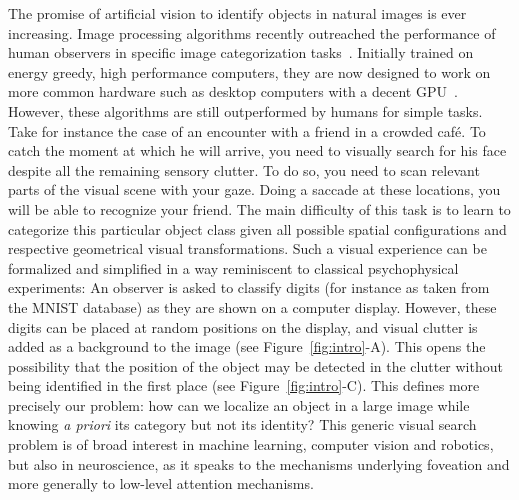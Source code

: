 The promise of artificial vision to identify objects in natural images is ever increasing. Image processing algorithms recently outreached the performance of human observers in specific image categorization tasks~\citep{He15}. Initially trained on energy greedy, high performance computers, they are now designed to work on more common hardware such as desktop computers with a decent GPU~\citep{Sandler18}. However, these algorithms are still outperformed by humans for simple tasks. Take for instance the case of an encounter with a friend in a crowded café. To catch the moment at which he will arrive, you need to visually search for his face despite all the remaining sensory clutter. To do so, you need to scan relevant parts of the visual scene with your gaze. Doing a saccade at these locations, you will be able to recognize your friend. The main difficulty of this task is to learn to categorize this particular object class given all possible spatial configurations and respective geometrical visual transformations. Such a visual experience can be formalized and simplified in a way reminiscent to classical psychophysical experiments: An observer is asked to classify digits (for instance as taken from the MNIST database) as they are shown on a computer display. However, these digits can be placed at random positions on the display, and visual clutter is added as a background to the image (see Figure~\ref{fig:intro}-A). This opens the possibility that the position of the object may be detected in the clutter without being identified in the first place  (see Figure~\ref{fig:intro}-C). This defines more precisely our problem: how can we localize an object in a large image while knowing \emph{a priori} its category but not its identity? This generic visual search problem is of broad interest in machine learning, computer vision and robotics, but also in neuroscience, as it speaks to the mechanisms underlying foveation and more generally to low-level attention mechanisms.

